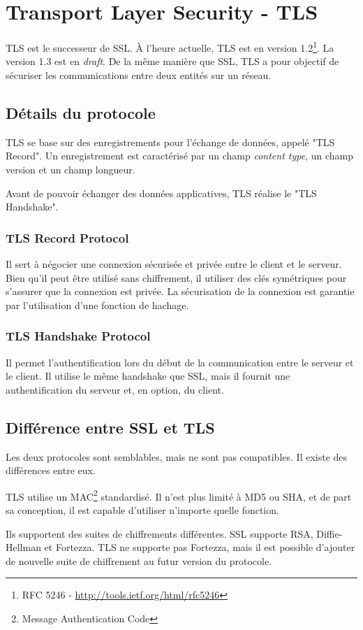 \section{Transport Layer Security - TLS}
TLS est le successeur de SSL.
À l'heure actuelle, TLS est en version 1.2\footnote{RFC 5246 - \url{http://tools.ietf.org/html/rfc5246}}. 
La version 1.3 est en \textit{draft}.
De la même manière que SSL, TLS a pour objectif de sécuriser les communications entre deux entités sur un réseau.

\subsection{Détails du protocole}
TLS se base sur des enregistrements pour l'échange de données, appelé "TLS Record".
Un enregistrement est caractérisé par un champ \textit{content type}, un champ version et un champ longueur.

Avant de pouvoir échanger des données applicatives, TLS réalise le "TLS Handshake".

\subsubsection{TLS Record Protocol}
Il sert à négocier une connexion sécurisée et privée entre le client et le serveur.
Bien qu'il peut être utilisé sans chiffrement, il utiliser des clés symétriques pour s'assurer que la connexion est privée.
La sécurisation de la connexion est garantie par l'utilisation d'une fonction de hachage.

\subsubsection{TLS Handshake Protocol}
Il permet l'authentification lors du début de la communication entre le serveur et le client.
Il utilise le même handshake que SSL, mais il fournit une authentification du serveur et, en option, du client.

\subsection{Différence entre SSL et TLS}
Les deux protocoles sont semblables, mais ne sont pas compatibles.
Il existe des différences entre eux.

TLS utilise un MAC\footnote{Message Authentication Code} standardisé.
Il n'est plus limité à MD5 ou SHA, et de part sa conception, il est capable d'utiliser n'importe quelle fonction.

Ils supportent des suites de chiffrements différentes.
SSL supporte RSA, Diffie-Hellman et Fortezza.
TLS ne supporte pas Fortezza, mais il est possible d'ajouter de nouvelle suite de chiffrement au futur version du protocole.